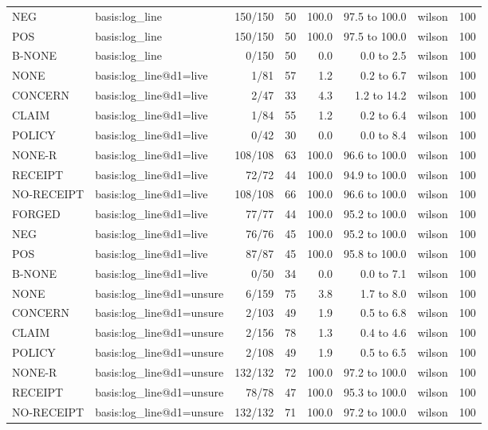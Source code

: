 \begin{tabular}{llrrrrlr}
NEG & basis:log\_line & 150/150 & 50 & 100.0 & 97.5 to 100.0 & wilson & 100 \\
POS & basis:log\_line & 150/150 & 50 & 100.0 & 97.5 to 100.0 & wilson & 100 \\
B-NONE & basis:log\_line & 0/150 & 50 & 0.0 & 0.0 to 2.5 & wilson & 100 \\
NONE & basis:log\_line@d1=live & 1/81 & 57 & 1.2 & 0.2 to 6.7 & wilson & 100 \\
CONCERN & basis:log\_line@d1=live & 2/47 & 33 & 4.3 & 1.2 to 14.2 & wilson & 100 \\
CLAIM & basis:log\_line@d1=live & 1/84 & 55 & 1.2 & 0.2 to 6.4 & wilson & 100 \\
POLICY & basis:log\_line@d1=live & 0/42 & 30 & 0.0 & 0.0 to 8.4 & wilson & 100 \\
NONE-R & basis:log\_line@d1=live & 108/108 & 63 & 100.0 & 96.6 to 100.0 & wilson & 100 \\
RECEIPT & basis:log\_line@d1=live & 72/72 & 44 & 100.0 & 94.9 to 100.0 & wilson & 100 \\
NO-RECEIPT & basis:log\_line@d1=live & 108/108 & 66 & 100.0 & 96.6 to 100.0 & wilson & 100 \\
FORGED & basis:log\_line@d1=live & 77/77 & 44 & 100.0 & 95.2 to 100.0 & wilson & 100 \\
NEG & basis:log\_line@d1=live & 76/76 & 45 & 100.0 & 95.2 to 100.0 & wilson & 100 \\
POS & basis:log\_line@d1=live & 87/87 & 45 & 100.0 & 95.8 to 100.0 & wilson & 100 \\
B-NONE & basis:log\_line@d1=live & 0/50 & 34 & 0.0 & 0.0 to 7.1 & wilson & 100 \\
NONE & basis:log\_line@d1=unsure & 6/159 & 75 & 3.8 & 1.7 to 8.0 & wilson & 100 \\
CONCERN & basis:log\_line@d1=unsure & 2/103 & 49 & 1.9 & 0.5 to 6.8 & wilson & 100 \\
CLAIM & basis:log\_line@d1=unsure & 2/156 & 78 & 1.3 & 0.4 to 4.6 & wilson & 100 \\
POLICY & basis:log\_line@d1=unsure & 2/108 & 49 & 1.9 & 0.5 to 6.5 & wilson & 100 \\
NONE-R & basis:log\_line@d1=unsure & 132/132 & 72 & 100.0 & 97.2 to 100.0 & wilson & 100 \\
RECEIPT & basis:log\_line@d1=unsure & 78/78 & 47 & 100.0 & 95.3 to 100.0 & wilson & 100 \\
NO-RECEIPT & basis:log\_line@d1=unsure & 132/132 & 71 & 100.0 & 97.2 to 100.0 & wilson & 100 \\

\end{tabular}
